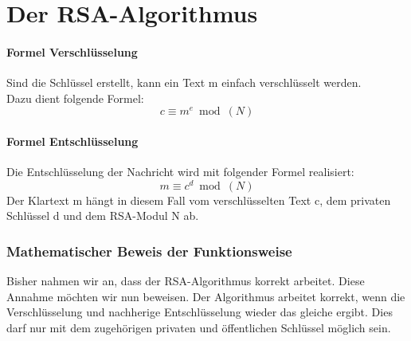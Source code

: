\part{Der RSA-Algorithmus}
%

%

%
\subsection{Formel Verschlüsselung}
Sind die Schlüssel erstellt, kann ein Text m einfach verschlüsselt werden.\\
Dazu dient folgende Formel:
%
\begin{equation}
  c \equiv m^e  \bmod(N)
  \label{eqn:rsa_encription}
\end{equation}
%

\subsection{Formel Entschlüsselung}
Die Entschlüsselung der Nachricht wird mit folgender Formel realisiert:
%
\begin{equation}
  m \equiv c^d \bmod(N)
  \label{eqn:rsa_decription}
\end{equation}
%
Der Klartext m hängt in diesem Fall vom verschlüsselten Text c, dem privaten Schlüssel d und dem RSA-Modul N ab. 
%
%
\newpage
\section{Mathematischer Beweis der Funktionsweise}
Bisher nahmen wir an, dass der RSA-Algorithmus korrekt arbeitet. Diese Annahme möchten wir nun beweisen. Der Algorithmus arbeitet korrekt, wenn die Verschlüsselung und nachherige Entschlüsselung wieder das gleiche ergibt. Dies darf nur mit dem zugehörigen privaten und öffentlichen Schlüssel möglich sein.
%
